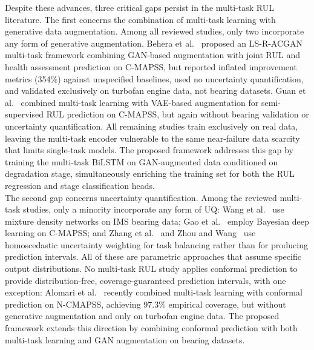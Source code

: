 Despite these advances, three critical gaps persist in the
multi-task RUL literature. The first concerns the combination of
multi-task learning with generative data augmentation. Among all
reviewed studies, only two incorporate any form of generative
augmentation.
Behera et al.~\cite{10107629} proposed an LS-R-ACGAN multi-task
framework combining GAN-based augmentation with joint RUL and
health assessment prediction on C-MAPSS, but reported inflated
improvement metrics (354\%) against unspecified baselines, used no
uncertainty quantification, and validated exclusively on turbofan
engine data, not bearing datasets.
Guan et al.~\cite{guan_enhanced_2026} combined multi-task learning
with VAE-based augmentation for semi-supervised RUL prediction on
C-MAPSS, but again without bearing validation or uncertainty
quantification. All remaining studies train exclusively on real data,
leaving the multi-task encoder vulnerable to the same near-failure
data scarcity that limits single-task models. The proposed framework
addresses this gap by training the multi-task BiLSTM on
GAN-augmented data conditioned on degradation stage, simultaneously
enriching the training set for both the RUL regression and stage
classification heads.\\

The second gap concerns uncertainty quantification. Among the
reviewed multi-task studies, only a minority incorporate any form
of UQ: Wang et al.~\cite{wang_multi-task_2024} use mixture density
networks on IMS bearing data;
Gao et al.~\cite{gao_bmtr-former_2026} employ Bayesian deep learning
on C-MAPSS; and
Zhang et al.~\cite{zhang_health_2022} and
Zhou and Wang~\cite{zhou_adaptive_2024} use homoscedastic uncertainty
weighting for task balancing rather than for producing prediction
intervals. All of these are parametric approaches that assume
specific output distributions. No multi-task RUL study applies
conformal prediction to provide distribution-free,
coverage-guaranteed prediction intervals, with one exception:
Alomari et al.~\cite{11488562} recently combined multi-task learning
with conformal prediction on N-CMAPSS, achieving 97.3\% empirical
coverage, but without generative augmentation and only on turbofan
engine data. The proposed framework extends this direction by
combining conformal prediction with both multi-task learning and GAN
augmentation on bearing datasets.\\

